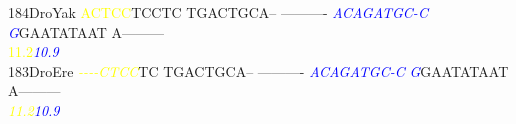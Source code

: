 \documentclass[11pt,twoside,reqno,a4paper]{article}
\begin{document}
{184\hspace*{1\charwidth}DroYak	\textcolor{yellow}{A}\textcolor{yellow}{C}\textcolor{yellow}{T}\textcolor{yellow}{C}\textcolor{yellow}{C}TCCTC	TGACTGCA--	----------	\textit{\textcolor{blue}{A}}\textit{\textcolor{blue}{C}}\textit{\textcolor{blue}{A}}\textit{\textcolor{blue}{G}}\textit{\textcolor{blue}{A}}\textit{\textcolor{blue}{T}}\textit{\textcolor{blue}{G}}\textit{\textcolor{blue}{C}}\textit{\textcolor{blue}{-}}\textit{\textcolor{blue}{C}}	\textit{\textcolor{blue}{G}}GAATATAAT	A---------	\\
\hspace*{4\charwidth}\hspace*{7\charwidth}\hspace*{0\charwidth}\textcolor{yellow}{11.2}\hspace*{1\charwidth}\hspace*{1\charwidth}\hspace*{1\charwidth}\hspace*{26\charwidth}\textit{\textcolor{blue}{10.9}}\hspace*{1\charwidth}\hspace*{1\charwidth}\hspace*{1\charwidth}\\
183\hspace*{1\charwidth}DroEre	\textit{\textcolor{yellow}{-}}\textit{\textcolor{yellow}{-}}\textit{\textcolor{yellow}{-}}\textit{\textcolor{yellow}{-}}\textit{\textcolor{yellow}{C}}\textit{\textcolor{yellow}{T}}\textit{\textcolor{yellow}{C}}\textit{\textcolor{yellow}{C}}TC	TGACTGCA--	----------	\textit{\textcolor{blue}{A}}\textit{\textcolor{blue}{C}}\textit{\textcolor{blue}{A}}\textit{\textcolor{blue}{G}}\textit{\textcolor{blue}{A}}\textit{\textcolor{blue}{T}}\textit{\textcolor{blue}{G}}\textit{\textcolor{blue}{C}}\textit{\textcolor{blue}{-}}\textit{\textcolor{blue}{C}}	\textit{\textcolor{blue}{G}}GAATATAAT	A---------	\\
\hspace*{4\charwidth}\hspace*{7\charwidth}\hspace*{0\charwidth}\textit{\textcolor{yellow}{11.2}}\hspace*{1\charwidth}\hspace*{1\charwidth}\hspace*{1\charwidth}\hspace*{26\charwidth}\textit{\textcolor{blue}{10.9}}\hspace*{1\charwidth}\hspace*{1\charwidth}\hspace*{1\charwidth}\\
}
\end{document}
